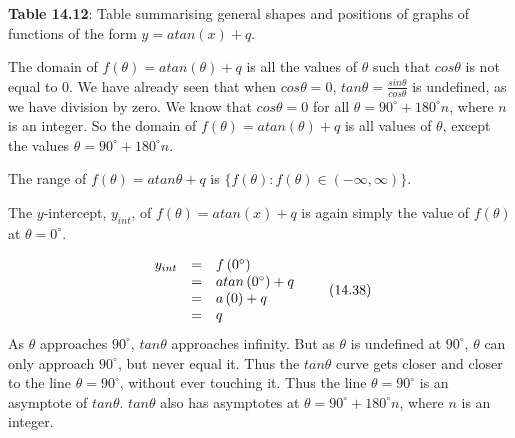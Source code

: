 \begin{center}{\small\bfseries Table 14.12}: Table summarising general shapes and positions of graphs of functions of the form $y=atan\left(x\right)+q$.\end{center}
\par
\label{m39414*uid87}
\nopagebreak
\label{m39414*id91059}The domain of $f\left(\theta \right)=atan\left(\theta \right)+q$ is all the values of $\theta $ such that $cos\theta $ is not equal to 0. We have already seen that when $cos\theta =0$, $tan\theta =\frac{sin\theta }{cos\theta }$ is undefined, as we have division by zero. We know that $cos\theta =0$ for all $\theta ={90}^{\circ }+{180}^{\circ }n$, where $n$ is an integer. So the domain of $f\left(\theta \right)=atan\left(\theta \right)+q$ is all values of $\theta $, except the values $\theta ={90}^{\circ }+{180}^{\circ }n$.\par 
\label{m39414*id91313}The range of $f\left(\theta \right)=atan\theta +q$ is $\{f\left(\theta \right):f\left(\theta \right)\in \left(-\infty ,\infty \right)\}$.\par 
\label{m39414*uid88}
\nopagebreak
\label{m39414*id91406}The $y$-intercept, ${y}_{int}$, of $f\left(\theta \right)=atan\left(x\right)+q$ is again simply the value of $f\left(\theta \right)$ at $\theta ={0}^{\circ }$.\par 
\label{m39414*id91511}\nopagebreak\noindent{}
\begin{equation}
\begin{array}{ccc}\hfill {y}_{int}& =& f\left({0}^{\circ }\right)\hfill \\ & =& atan\left({0}^{\circ }\right)+q\hfill \\ & =& a\left(0\right)+q\hfill \\ & =& q\hfill \end{array}\tag{14.38}
\end{equation}
\label{m39414*uid89}
\nopagebreak
\label{m39414*id91637}As $\theta $ approaches ${90}^{\circ }$, $tan\theta $ approaches infinity. But as $\theta $ is undefined at ${90}^{\circ }$, $\theta $ can only approach ${90}^{\circ }$, but never equal it. Thus the $tan\theta $ curve gets closer and closer to the line $\theta ={90}^{\circ }$, without ever touching it. Thus the line $\theta ={90}^{\circ }$ is an asymptote of $tan\theta $. $tan\theta $ also has asymptotes at $\theta ={90}^{\circ }+{180}^{\circ }n$, where $n$ is an integer.\par 
